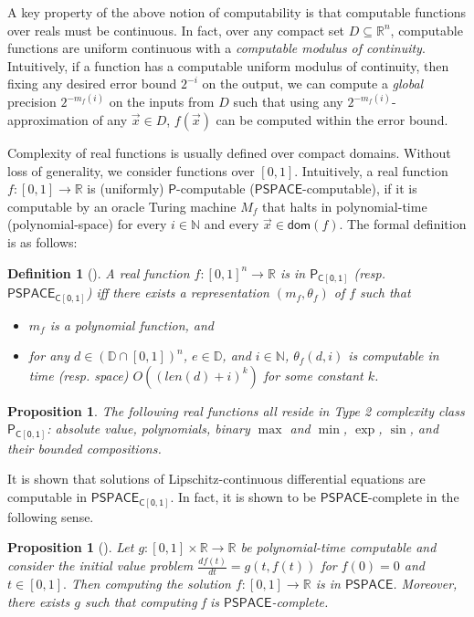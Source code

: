 \documentclass[12pt]{article}
\theoremstyle{plain}
\newtheorem{proposition}[theorem]{Proposition}
\newtheorem{definition}[theorem]{Definition}
\theoremstyle{definition}
\newcommand{\dom}{\mathsf{dom}}
\begin{document}
A key property of the above notion of computability is that computable functions over reals must be continuous. In fact, over any compact set $D\subseteq \mathbb{R}^n$, computable functions are uniform continuous with a {\em computable modulus of continuity}. Intuitively, if a function has a computable uniform modulus of continuity, then fixing any desired error bound $2^{-i}$ on the output, we can compute a {\em global} precision $2^{-m_f(i)}$ on the inputs from $D$ such that using any $2^{-m_f(i)}$-approximation of any $\vec x\in D$, $f(\vec x)$ can be computed within the error bound.

Complexity of real functions is usually defined over compact domains. Without loss of generality, we consider functions over $[0,1]$. Intuitively, a real function $f:[0,1]\rightarrow\mathbb{R}$ is (uniformly) $\mathsf{P}$-computable ($\mathsf{PSPACE}$-computable), if it is computable by an oracle Turing machine $M_{f}$ that halts in polynomial-time (polynomial-space) for every $i\in \mathbb{N}$ and every $\vec x\in \dom(f)$. The formal definition is as follows:
\begin{definition}[\cite{Kobook}]
A real function $f: [0,1]^n\rightarrow \mathbb{R}$ is in $\mathsf{P_{C[0,1]}}$ (resp. $\mathsf{PSPACE_{C[0,1]}}$) iff there exists a representation $(m_f, \theta_f)$ of $f$ such that
\begin{itemize}
\item $m_f$ is a polynomial function, and
\item for any $d\in (\mathbb{D}\cap [0,1])^n$, $e\in \mathbb{D}$, and $i\in \mathbb{N}$, $\theta_f(d,i)$ is computable in time (resp. space) $O((\mathit{len}(d)+i)^k)$ for some constant $k$.
\end{itemize}
\end{definition}
\begin{proposition}
The following real functions all reside in Type 2 complexity class $\mathsf{P_{C[0,1]}}$: absolute value, polynomials, binary $\max$ and $\min$, $\exp$, $\sin$, and their bounded compositions. \end{proposition}
It is shown that solutions of Lipschitz-continuous differential equations are computable in $\mathsf{PSPACE_{C[0,1]}}$. In fact, it is shown to be $\mathsf{PSPACE}$-complete in the following sense.
\begin{proposition}[\cite{Kawamura09}]
Let $g:[0,1]\times \mathbb{R}\rightarrow \mathbb{R}$ be polynomial-time computable and consider the initial value problem $\frac{df(t)}{dt} = g(t, f(t))$ for $f(0)=0$ and $t\in [0,1].$ Then computing the solution $f:[0,1]\rightarrow \mathbb{R}$ is in $\mathsf{PSPACE}$. Moreover, there exists $g$ such that computing f is $\mathsf{PSPACE}$-complete.
\end{proposition}
\end{document}
